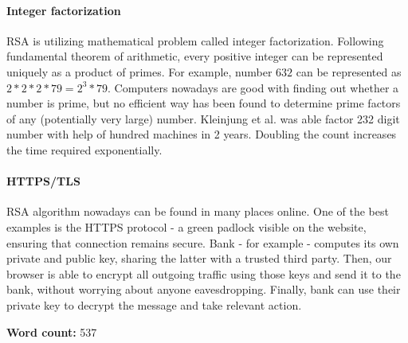 \documentclass[11pt]{article}
\begin{document}
\begin{multicols}{2}
\paragraph{Integer factorization}
RSA is utilizing mathematical problem called integer factorization. Following fundamental theorem of arithmetic, every positive integer can be represented uniquely as a product of primes. For example, number $632$ can be represented as $2*2*2*79 = 2^3 * 79$. Computers nowadays are good with finding out whether a number is prime, but no efficient way has been found to determine prime factors of any (potentially very large) number. Kleinjung et al. was able factor 232 digit number with help of hundred machines in 2 years.\cite{kleinjung2010factorization} Doubling the count increases the time required exponentially. 

\paragraph{HTTPS/TLS}
RSA algorithm nowadays can be found in many places online. One of the best examples is the HTTPS protocol - a green padlock visible on the website, ensuring that connection remains secure. Bank - for example - computes its own private and public key, sharing the latter with a trusted third party. Then, our browser is able to encrypt all outgoing traffic using those keys and send it to the bank, without worrying about anyone eavesdropping. Finally, bank can use their private key to decrypt the message and take relevant action.

\nocite{*}

\end{multicols}

\begin{figure}%
    \centering
    \qquad
    \label{fig:example}%
  \end{figure}




{\huge \textbf{Word count:} 537}
\end{document}
